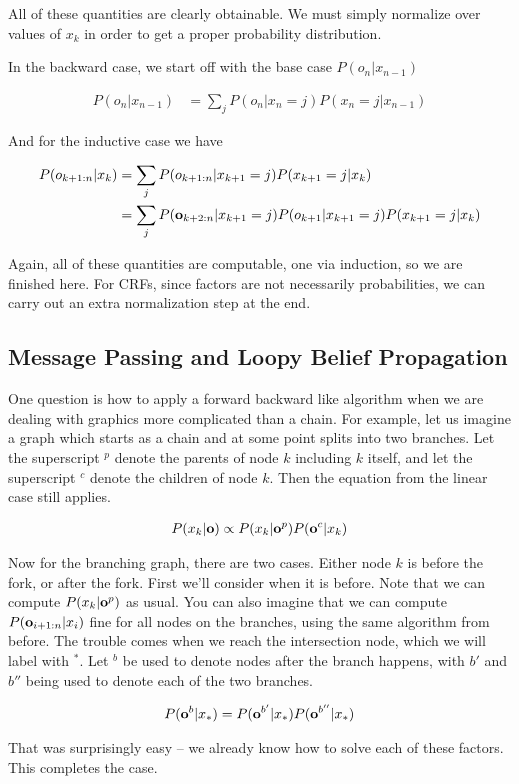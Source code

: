 \documentclass[12pt]{article}
\newcommand{\eq}[1]{\begin{align*}#1\end{align*}}
\begin{document}
All of these quantities are clearly obtainable. We must simply normalize over values of $x_k$ in order to get a proper probability distribution.

In the backward case, we start off with the base case $P(o_n|x_{n-1})$

\eq{
  P(o_n|x_{n-1}) &= \sum_j P(o_n|x_n = j)P(x_n=j|x_{n-1})
}

And for the inductive case we have

\eq{
  P(o_{k+1:n}|x_k) &= \sum_j P(o_{k+1:n}|x_{k+1}=j)P(x_{k+1}=j|x_k) \\
  &= \sum_j P(\o_{k+2:n}|x_{k+1}=j)P(o_{k+1}|x_{k+1} = j)P(x_{k+1}=j|x_k) \\
}

Again, all of these quantities are computable, one via induction, so we are finished here. For CRFs, since factors are not necessarily probabilities, we can carry out an extra normalization step at the end.

\subsection{Message Passing and Loopy Belief Propagation}

One question is how to apply a forward backward like algorithm when we are dealing with graphics more complicated than a chain. For example, let us imagine a graph which starts as a chain and at some point splits into two branches. Let the superscript $^p$ denote the parents of node $k$ including $k$ itself, and let the superscript $^c$ denote the children of node $k$. Then the equation from the linear case still applies.

\eq{
  P(x_k|\o) \propto P(x_k|\o^p)P(\o^c|x_k)
}

Now for the branching graph, there are two cases. Either node $k$ is before the fork, or after the fork. First we'll consider when it is before. Note that we can compute $P(x_k|\mathbf{o}^p)$ as usual. You can also imagine that we can compute $P(\mathbf{o}_{i+1:n}|x_i)$ fine for all nodes on the branches, using the same algorithm from before. The trouble comes when we reach the intersection node, which we will label with $^*$. Let $^b$ be used to denote nodes after the branch happens, with $b'$ and $b''$ being used to denote each of the two branches.

\eq{
  P(\o^b|x_*) &= P(\o^{b'}|x_*)P(\o^{b''}|x_*) \\
}

That was surprisingly easy -- we already know how to solve each of these factors. This completes the case.
\end{document}
